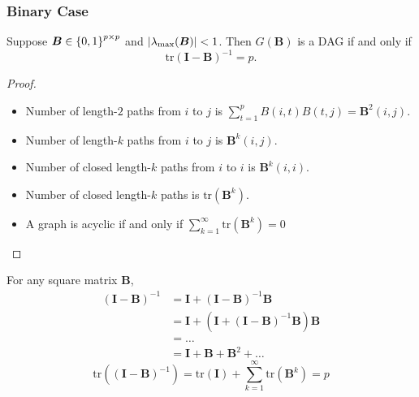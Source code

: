 \documentclass[10pt,xcolor={usenames,dvipsnames,table}]{beamer}
\begin{document}
\begin{frame}
    \frametitle{Binary Case}
    \begin{proposition}
        Suppose $\bm{B} \in \left\{0,1\right\}^{p \times p}$ and $\left\lvert\lambda_{\max}(\bm{B})\right\rvert < 1$. Then $G(\bm{B})$ is a DAG if and only if 
        \[
        \text{tr}(\mathbf{I} - \bm{B})^{-1} = p.
        \] 
    \end{proposition}
    \begin{proof}
        \begin{itemize}
            \item Number of length-$2$ paths from $i$ to $j$ is  $\sum^{p}_{t=1} B(i, t) B(t, j) = \bm{B}^{2}(i, j)$.
            \item Number of length-$k$ paths from $i$ to  $j$ is  $\bm{B}^{k}(i, j)$.
            \item Number of closed length-$k$ paths from $i$ to $i$ is $\bm{B}^{k}(i, i)$.
            \item Number of closed length-$k$ paths is  $\text{tr} (\bm{B}^{k})$.
            \item A graph is acyclic if and only if 
                $ \sum^{\infty}_{k=1} \text{tr}(\bm{B}^{k}) = 0$ 
        \end{itemize}

    \end{proof}
\end{frame}
\begin{frame}
    For any square matrix $\bm{B}$,
    \begin{align*}
        (\bm{I} - \bm{B})^{-1} 
        &= \bm{I} + (\bm{I} - \bm{B})^{-1} \bm{B} \\
        &= \bm{I} + (\bm{I} + (\bm{I}-\bm{B})^{-1}\bm{B}) \bm{B} \\
        &= \ldots  \\
        &= \bm{I}+ \bm{B} + \bm{B}^{2} + \ldots 
    \end{align*} 
    \[
    \text{tr}\left((\bm{I} - \bm{B})^{-1}\right) = \text{tr}(\bm{I}) + \sum^{\infty}_{k=1} \text{tr}(\bm{B}^{k}) = p
    \] 

\end{frame}
\end{document}
